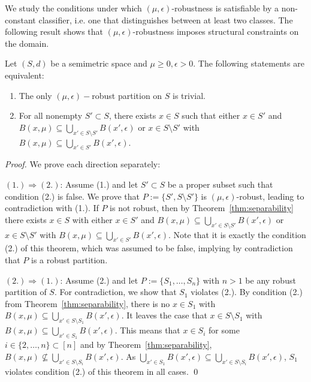 We study the conditions under which $(\mu, \epsilon)$-robustness is satisfiable by a non-constant classifier, i.e. one that distinguishes between at least two classes. The following result shows that $(\mu, \epsilon)$-robustness imposes structural constraints on the domain.
\begin{theorem}
\label{thm:existence}
Let $(S,d)$ be a semimetric space and $\mu \geq 0, \epsilon > 0$. The following statements are equivalent:
\begin{enumerate}
    \item The only $(\mu,\epsilon)-$robust partition on $S$ is trivial.
    \item For all nonempty $S' \subset S$, there exists $x \in S$ such that either $x \in S'$ and $B(x,\mu) \subseteq \bigcup_{x' \in S \setminus S'} B(x', \epsilon)$ or $x \in S \setminus S'$ with $B(x,\mu) \subseteq \bigcup_{x' \in S'} B(x', \epsilon)$.
\end{enumerate}
\end{theorem}
\begin{proof}
    We prove each direction separately:

    $(1.) \Rightarrow (2.)$:
    Assume (1.) and let $S' \subset S$ be a proper subset such that condition (2.) is false. We prove that $P := \{S', S\setminus S'\}$ is $(\mu, \epsilon)$-robust, leading to contradiction with (1.). If $P$ is not robust, then by Theorem~\ref{thm:separability} there exists $x \in S$ with either $x \in S'$ and $B(x, \mu) \subseteq \bigcup_{x' \in S \setminus S'} B(x', \epsilon)$ or $x \in S \setminus S'$ with $B(x,\mu) \subseteq \bigcup_{x' \in S'} B(x', \epsilon)$. Note that it is exactly the condition (2.) of this theorem, which was assumed to be false, implying by contradiction that $P$ is a robust partition.

    $(2.) \Rightarrow (1.)$:
    Assume (2.) and let $P := \{S_1, \dots, S_n\}$ with $n > 1$ be any robust partition of $S$. For contradiction, we show that $S_1$ violates (2.). By condition (2.) from Theorem~\ref{thm:separability}, there is no $x \in S_1$ with $B(x, \mu) \subseteq \bigcup_{x' \in S \setminus S_1} B(x', \epsilon)$. It leaves the case that $x \in S \setminus S_1$ with $B(x,\mu) \subseteq \bigcup_{x' \in S_1} B(x', \epsilon)$. This means that $x \in S_i$ for some $ i \in \{2,\dots,n\} \subset [n]$ and by Theorem~\ref{thm:separability}, $B(x, \mu) \not\subseteq \bigcup_{x' \in S\setminus S_i} B(x', \epsilon)$. As $\bigcup_{x' \in S_1} B(x', \epsilon) \subseteq \bigcup_{x' \in S\setminus S_i} B(x', \epsilon)$, $S_1$ violates condition (2.) of this theorem in all cases.
    \qed
\end{proof}

